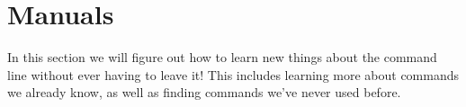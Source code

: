 \documentclass[oneside]{book}
\newcommand{\commandline}[1]{\begin{center} \colorbox{Dark}{\textcolor{white}{#1}} \end{center}}
\newtheorem{ex}{Exercise}[chapter]
\begin{document}

\section{Manuals}
In this section we will figure out how to learn new things about the command line without ever having to leave it! This includes learning more about commands we already know, as well as finding commands we've never used before.
\end{document}
